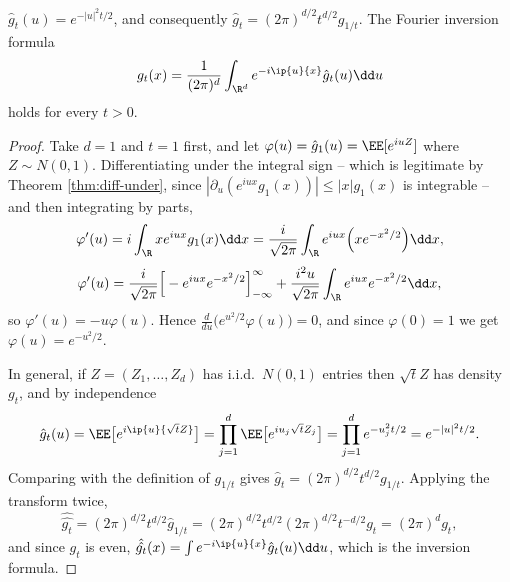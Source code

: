 \begin{proposition}\label{prop:gauss-ft}
	$\hat g_t(u) = e^{-|u|^2 t/2}$, and consequently $\hat g_t = (2\pi)^{d/2}t^{d/2}g_{1/t}$. The Fourier inversion formula
	$$
	g_t(x) = \frac{1}{(2\pi)^d}\int_{\R^d}e^{-i\ip{u}{x}}\hat g_t(u)\dd u
	$$
	holds for every $t>0$.
\end{proposition}
\begin{proof}
	Take $d=1$ and $t=1$ first, and let $\varphi(u)=\hat g_1(u)=\EE[e^{iuZ}]$ where $Z \sim N(0,1)$. Differentiating under the integral sign -- which is legitimate by Theorem \ref{thm:diff-under}, since $|\partial_u(e^{iux}g_1(x))| \leq |x|g_1(x)$ is integrable -- and then integrating by parts,
	$$
	\varphi'(u) = i\int_\R x e^{iux}g_1(x)\dd x = \frac{i}{\sqrt{2\pi}}\int_\R e^{iux}\Big(x e^{-x^2/2}\Big)\dd x,
	$$
	$$
	\varphi'(u) = \frac{i}{\sqrt{2\pi}}\Big[ -e^{iux}e^{-x^2/2}\Big]_{-\infty}^\infty + \frac{i^2 u}{\sqrt{2\pi}}\int_\R e^{iux}e^{-x^2/2}\dd x,
	$$
	so $\varphi'(u)=-u\varphi(u)$. Hence $\frac{d}{du}\big(e^{u^2/2}\varphi(u)\big)=0$, and since $\varphi(0)=1$ we get $\varphi(u)=e^{-u^2/2}$.

	In general, if $Z=(Z_1,\dots,Z_d)$ has i.i.d.\ $N(0,1)$ entries then $\sqrt t Z$ has density $g_t$, and by independence
	$$
	\hat g_t(u) = \EE\big[e^{i\ip{u}{\sqrt tZ}}\big] = \prod_{j=1}^d\EE\big[e^{iu_j\sqrt t Z_j}\big]=\prod_{j=1}^d e^{-u_j^2t/2}=e^{-|u|^2t/2}.
	$$
	Comparing with the definition of $g_{1/t}$ gives $\hat g_t = (2\pi)^{d/2}t^{d/2}g_{1/t}$. Applying the transform twice,
	$$
	\hat{\hat{g_t}} = (2\pi)^{d/2}t^{d/2}\hat g_{1/t} = (2\pi)^{d/2}t^{d/2}(2\pi)^{d/2}t^{-d/2}g_t = (2\pi)^d g_t,
	$$
	and since $g_t$ is even, $\hat{\hat{g_t}}(x) = \int e^{-i\ip{u}{x}}\hat g_t(u)\dd u$, which is the inversion formula.
\end{proof}

